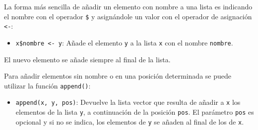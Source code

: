 \documentclass[
  a4paper,
]{scrreport}
\providecommand{\tightlist}{%
  \setlength{\itemsep}{0pt}\setlength{\parskip}{0pt}}\usepackage{longtable,booktabs,array}
\theoremstyle{definition}
\theoremstyle{definition}
\theoremstyle{remark}
\begin{document}
La forma más sencilla de añadir un elemento con nombre a una lista es
indicando el nombre con el operador \texttt{\$} y asignándole un valor
con el operador de asignación \texttt{\textless{}-}:

\begin{itemize}
\tightlist
\item
  \texttt{x\$nombre\ \textless{}-\ y}: Añade el elemento \texttt{y} a la
  lista \texttt{x} con el nombre \texttt{nombre}.
\end{itemize}

El nuevo elemento se añade siempre al final de la lista.

Para añadir elementos sin nombre o en una posición determinada se puede
utilizar la función \texttt{append()}:

\begin{itemize}
\tightlist
\item
  \texttt{append(x,\ y,\ pos)}: Devuelve la lista vector que resulta de
  añadir a \texttt{x} los elementos de la lista \texttt{y}, a
  continuación de la posición \texttt{pos}. El parámetro \texttt{pos} es
  opcional y si no se indica, los elementos de \texttt{y} se añaden al
  final de los de \texttt{x}.
\end{itemize}
\end{document}
